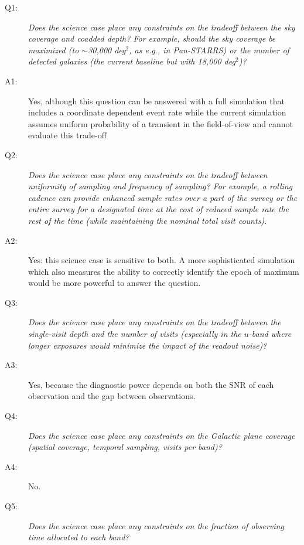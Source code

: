  \begin{description}

 \item[Q1:] {\it Does the science case place any constraints on the
 tradeoff between the sky coverage and coadded depth? For example,
 should the sky coverage be maximized (to $\sim$30,000 deg$^2$, as e.g.,
 in Pan-STARRS) or the number of detected galaxies (the current baseline
 but with 18,000 deg$^2$)?}

 \item[A1:] Yes, although this question can be answered with a full simulation that includes a coordinate dependent event rate while the current simulation assumes uniform probability of a transient in the field-of-view and cannot evaluate this trade-off


 \item[Q2:] {\it Does the science case place any constraints on the
 tradeoff between uniformity of sampling and frequency of sampling? For
 example, a rolling cadence can provide enhanced sample rates over a
 part of the survey or the entire survey for a designated time at the
 cost of reduced sample rate the rest of the time (while maintaining the
 nominal total visit counts).}

 \item[A2:] Yes: this science case is sensitive to both. A more sophisticated simulation which also measures the ability to correctly identify the epoch of maximum would be more powerful to answer the question.


 \item[Q3:] {\it Does the science case place any constraints on the
 tradeoff between the single-visit depth and the number of visits
 (especially in the $u$-band where longer exposures would minimize the
 impact of the readout noise)?}

 \item[A3:] Yes, because the diagnostic power depends on both the SNR of each observation and the gap between observations.


 \item[Q4:] {\it Does the science case place any constraints on the
 Galactic plane coverage (spatial coverage, temporal sampling, visits
 per band)?}

 \item[A4:] No.


 \item[Q5:] {\it Does the science case place any constraints on the
 fraction of observing time allocated to each band?}


\end{description}
